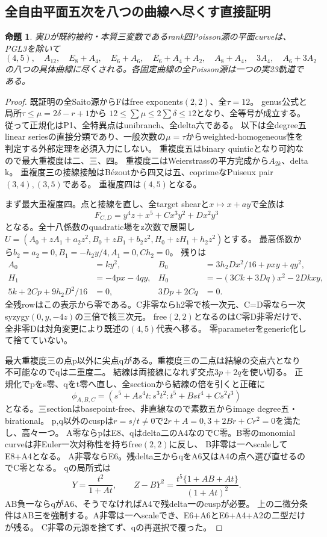 \documentclass[a4paper,11pt]{ltjsarticle}
\newtheorem{proposition}{命題}[section]
\theoremstyle{definition}
\begin{document}
\subsection{全自由平面五次を八つの曲線へ尽くす直接証明}
\begin{proposition}\label{prop:essential-three-eight-curves}
実Dが既約被約・本質三変数であるrank四Poisson源の平面curveは、PGL3を除いて
\[
 (4,5),\quad A_{12},\quad E_8+A_4,\quad E_6+A_6,\quad E_6+A_4+A_2,
 \quad A_8+A_4,\quad3A_4,\quad A_6+3A_2
\]
の八つの具体曲線に尽くされる。各固定曲線の全Poisson源は一つの実23軌道である。
\end{proposition}
\begin{proof}
既証明の全Saito源からFはfree exponents$(2,2)$、全$\tau=12$。
genus公式と局所$\tau\le\mu=2\delta-r+1$から
$12\le\sum\mu\le2\sum\delta\le12$となり、全等号が成立する。
従って正規化はP1、全特異点はunibranch、全delta六である。
以下は全degree五linear seriesの直接分類であり、一般次数の$\mu=\tau$からweighted-homogeneous性を判定する外部定理を必須入力にしない。
重複度五はbinary quinticとなり可約なので最大重複度は二、三、四。
重複度二はWeierstrassの平方完成から$A_{2k}$、delta k。
重複度三の接線接触はB\'ezoutから四又は五、coprimeなPuiseux pair$(3,4),(3,5)$である。
重複度四は$(4,5)$となる。

まず最大重複度四。点と接線を直し、全target shearと$x\mapsto x+ay$で全族は
\[
 F_{C,D}=y^4z+x^5+Cx^3y^2+Dx^2y^3
\]
となる。全十八係数のquadratic場をz次数で展開し$U=(A_0+zA_1+a_2z^2,
B_0+zB_1+b_2z^2,H_0+zH_1+h_2z^2)$とする。
最高係数から$b_2=a_2=0,B_1=-h_2y/4,A_1=0,Ch_2=0$。
残りは
\[
\begin{aligned}
 A_0&=ky^2,& B_0&=3h_2Dx^2/16+pxy+qy^2,\\
 H_1&=-4px-4qy,&H_0&=-(3Ck+3Dq)x^2-2Dkxy,\\
 5k+2Cp+9h_2D^2/16&=0,&3Dp+2Cq&=0.
\end{aligned}
\]
全残rowはこの表示から零である。C非零ならh2零で核一次元、C=D零なら一次syzygy$(0,y,-4z)$の三倍で核三次元。
free$(2,2)$となるのはC零D非零だけで、全非零Dは対角変更により既述の$(4,5)$代表へ移る。
零parameterをgeneric化して捨てていない。

最大重複度三の点p以外に尖点qがある。重複度三の二点は結線の交点六となり不可能なのでqは二重度二。
結線は両接線になれず交点$3p+2q$を使い切る。
正規化でpをs零、qをt零へ直し、全sectionから結線の倍を引くと正確に
\[
 \phi_{A,B,C}=(s^5+As^4t:s^3t^2:t^5+Bst^4+Cs^2t^3)
\]
となる。三sectionはbasepoint-free、非直線なので素数五からimage degree五・birational。
p,q以外のcuspは$r=s/t\ne0$で$2r+A=0,3+2Br+Cr^2=0$を満たし、高々一つ。
A零ならpはE8、qはdelta二のA4なのでC零。B零のmonomial curveは非Euler一次対称性を持ちfree$(2,2)$に反し、
B非零は一へscaleしてE8+A4となる。
A非零ならE6。残delta三からqをA6又はA4の点へ選び直せるのでC零となる。
qの局所式は
\[
 Y=\frac{t^2}{1+At},\qquad
 Z-BY^2=\frac{t^5\{1+AB+At\}}{(1+At)^2}.
\]
AB負一ならqがA6、そうでなければA4で残delta一のcuspが必要。
上の二微分条件はAB三を強制する。A非零は一へscaleでき、E6+A6とE6+A4+A2の二型だけが残る。
C非零の元源を捨てず、qの再選択で覆った。


\end{proof}
\end{document}
